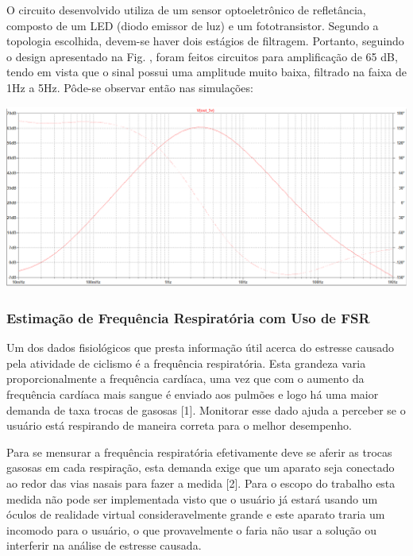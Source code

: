     O circuito desenvolvido utiliza de um sensor optoeletrônico de refletância, composto de um LED (diodo emissor de luz) e um fototransistor. Segundo a topologia escolhida, devem-se haver dois estágios de filtragem. Portanto, seguindo o design apresentado na Fig. %
    , foram feitos circuitos para amplificação de 65 dB, tendo em vista que o sinal possui uma amplitude muito baixa, filtrado na faixa de 1Hz a 5Hz. Pôde-se observar então nas simulações:
    
    \begin{center}
    	\includegraphics[scale=0.3]{figuras/Simulacao_Cardio}
        \label{cardio_sim}
    \end{center}
    
\subsubsection{Estimação de Frequência Respiratória com Uso de FSR}

	Um dos dados fisiológicos que presta informação útil acerca do estresse causado pela atividade de ciclismo é a frequência respiratória. Esta grandeza varia proporcionalmente a frequência cardíaca, uma vez que com o aumento da frequência cardíaca mais sangue é enviado aos pulmões e logo há uma maior demanda de taxa trocas de gasosas [1].  Monitorar esse dado ajuda a perceber se o usuário está respirando de maneira correta para o melhor desempenho.
    
	Para se mensurar a frequência respiratória efetivamente deve se aferir as trocas gasosas em cada respiração, esta demanda exige que um aparato seja conectado ao redor das vias nasais para fazer a medida [2]. Para o escopo do trabalho esta medida não pode ser implementada visto que o usuário já estará usando um óculos de realidade virtual consideravelmente grande e este aparato traria um incomodo para o usuário, o que provavelmente o faria não usar a solução ou interferir na análise de estresse causada.
    
